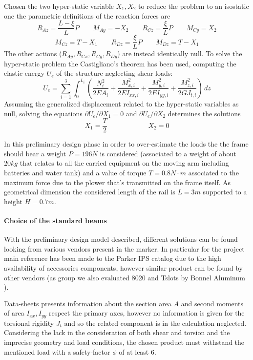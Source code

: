 	Chosen the two hyper-static variable $X_1,X_2$ to reduce the problem to an isostatic one the parametric definitions of the reaction forces are
	\[ R_{Az} = \frac {L-\xi}L P \qquad M_{Ay} = -X_2 \qquad R_{Cz} = \frac \xi L P \qquad M_{Cy} = X_2 \] \[ M_{Cz} = T - X_1 \qquad R_{Dz} = \frac \xi L P \qquad M_{Dz} = T - X_1 \]
	The other actions ($R_{Ay},R_{Cx}, R_{Cy}, R_{Dy}$) are instead identically null. To solve the hyper-static problem the Castigliano's theorem has been used, computing the elastic energy $U_e$ of the structure neglecting shear loads:
	\[ U_e = \sum_{i=1}^3 \int_0 ^{L_i}  \left( \frac{N_i^2}{2EA_i} + \frac{M_{x,i}^2}{2 EI_{xx,i}} + \frac{M_{y,i}^2}{2 E I_{yy,i}} + \frac{M_{z,i}^2}{2G J_{t,i}}  \right)\, dz \]
	Assuming the generalized displacement related to the hyper-static variables as null, solving the equations $\partial U_e / \partial X_1 = 0$ and $\partial U_e/\partial X_2$ determines the solutions
	\[ X_1 = \frac T 2 \qquad \qquad \qquad X_2 = 0 \]
	
	
	In this preliminary design phase in order to over-estimate the loads the the frame should bear a weight $P = 196 N$ is considered (associated to a weight of about $20kg$ that relates to all the carried equipment on the moving arm including batteries and water tank) and a value of torque $T = 0.8 N\cdot m$ associated to the maximum force due to the plower that's transmitted on the frame itself. As geometrical dimension the considered length of the rail is $L=3m$ supported to a height $H = 0.7m$.
	
	\paragraph{Choice of the standard beams} With the preliminary design model described, different solutions can be found looking from various vendors present in the marker. In particular for the project main reference has been made to the Parker IPS catalog \cite{parker-ds} due to the high availability of accessories components, however similar product can be found by other vendors (as group we also evaluated 8020 \cite{8020-ds} and Tslots by Bonnel Aluminum \cite{tslot-ds}).
	
	Data-sheets presents information about the section area $A$ and second moments of area $I_{xx},I_{yy}$ respect the primary axes, however no information is given for the torsional rigidity $J_t$ and so the related component is in the calculation neglected. Considering the lack in the consideration of both shear and torsion and the imprecise geometry and load conditions, the chosen product must withstand the mentioned load with a safety-factor $\phi$ of at least 6.
	
